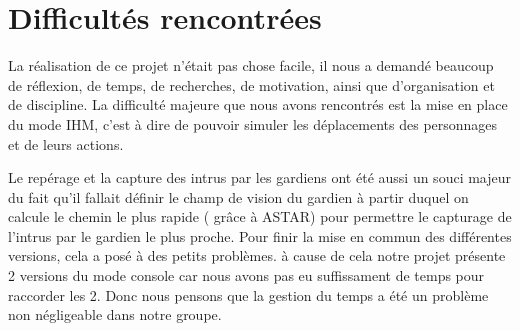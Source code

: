 \section{Difficultés rencontrées}

\paragraphe{}La réalisation de ce projet n'était pas chose facile, il nous a demandé beaucoup de réflexion, de temps, de recherches, de motivation, ainsi que d'organisation et de discipline. La difficulté majeure que nous avons rencontrés est la mise en place du mode IHM, c'est à dire de pouvoir simuler les déplacements des personnages et de leurs actions.
\vspace{1cm}

\paragraphe{}Le repérage et la capture des intrus par les gardiens ont été aussi un souci majeur du fait qu'il fallait définir le champ de vision du gardien à partir duquel on  calcule le chemin le plus rapide ( grâce à ASTAR) pour permettre le capturage de l'intrus par le gardien le plus proche.
\vspace{1cm}
\paragraphe{}Pour finir la mise en commun des différentes versions, cela a posé à des petits problèmes. à cause de cela notre projet présente 2 versions du mode console car nous avons pas eu suffissament de temps pour raccorder les 2. Donc nous pensons que la gestion du temps a été un problème non négligeable dans notre groupe.
